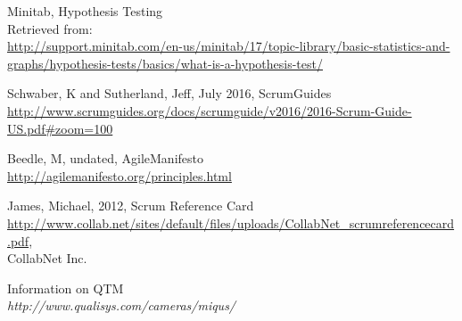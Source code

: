 \begin{thebibliography}{9}
    Minitab, Hypothesis Testing\\
\qquad Retrieved from:\\
    \url{http://support.minitab.com/en-us/minitab/17/topic-library/basic-statistics-and-graphs/hypothesis-tests/basics/what-is-a-hypothesis-test/}


         Schwaber, K and Sutherland, Jeff, July 2016, ScrumGuides \\ 
\url{http://www.scrumguides.org/docs/scrumguide/v2016/2016-Scrum-Guide-US.pdf#zoom=100}
    
         Beedle, M, undated, AgileManifesto  \\
\url{http://agilemanifesto.org/principles.html}


         James, Michael, 2012, Scrum Reference Card    \\ %
\url{http://www.collab.net/sites/default/files/uploads/CollabNet_scrumreferencecard.pdf},\\
        CollabNet Inc.
        
        
        
             Information on QTM \\ 
\textit{http://www.qualisys.com/cameras/miqus/}






\end{thebibliography}




